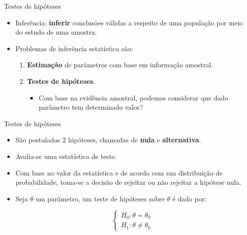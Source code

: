 \documentclass[
  ignorenonframetext,
  serif,
  professionalfont,
  usenames,
  dvipsnames,
  aspectratio = 169]{beamer}
\begin{document}
\begin{frame}{Testes de hipóteses}
\protect\hypertarget{testes-de-hipuxf3teses-1}{}
\begin{itemize}
    \itemsep 2ex
  
  \item Inferência: \textbf{inferir} conclusões válidas a respeito de uma população por meio do estudo de uma amostra.
  
  \item Problemas de inferência estatística são:
    \begin{enumerate}
    
      \itemsep 2ex
      
      \item \textbf{Estimação} de parâmetros com base em informação amostral.
      
      \item \textbf{Testes de hipóteses}.
        \begin{itemize}
          \item Com base na evidência amostral, podemos considerar que dado parâmetro tem determinado valor?
        \end{itemize}
    
    \end{enumerate}
  
  \end{itemize}
\end{frame}

\begin{frame}{Testes de hipóteses}
\protect\hypertarget{testes-de-hipuxf3teses-2}{}
\begin{itemize}
    \itemsep 2ex
  
  \item São postuladas 2 hipóteses, chamadas de \textbf{nula} e \textbf{alternativa}.
  
  \item Avalia-se uma estatística de teste. 
  
  \item Com base no valor da estatística e de acordo com sua distribuição de probabilidade, toma-se a decisão de rejeitar ou não rejeitar a hipótese nula.
    
  \item Seja $\theta$ um parâmetro, um teste de hipóteses sobre $\theta$ é dado por:
  
$$
\left\{\begin{matrix}
H_0: \theta = \theta_0 \\ 
H_1: \theta \neq \theta_0
\end{matrix}\right.
$$  
  
  \end{itemize}
\end{frame}
\end{document}
